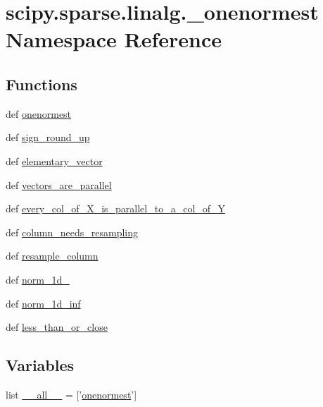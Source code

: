 \hypertarget{namespacescipy_1_1sparse_1_1linalg_1_1__onenormest}{}\section{scipy.\+sparse.\+linalg.\+\_\+onenormest Namespace Reference}
\label{namespacescipy_1_1sparse_1_1linalg_1_1__onenormest}
\subsection*{Functions}
\begin{DoxyCompactItemize}
\item 
def \hyperlink{namespacescipy_1_1sparse_1_1linalg_1_1__onenormest_a90813fe55db4e2c30f4ccd874c5bf117}{onenormest}
\item 
def \hyperlink{namespacescipy_1_1sparse_1_1linalg_1_1__onenormest_adf75977d22fe85b425c08a754dd4d4f6}{sign\+\_\+round\+\_\+up}
\item 
def \hyperlink{namespacescipy_1_1sparse_1_1linalg_1_1__onenormest_a688dda78fdf831b1482fb78e951f082b}{elementary\+\_\+vector}
\item 
def \hyperlink{namespacescipy_1_1sparse_1_1linalg_1_1__onenormest_a67ee4c8d1a1f9cd0d58974172f5617f2}{vectors\+\_\+are\+\_\+parallel}
\item 
def \hyperlink{namespacescipy_1_1sparse_1_1linalg_1_1__onenormest_ad817047ca7e3bca66af3e1bb02d69caa}{every\+\_\+col\+\_\+of\+\_\+\+X\+\_\+is\+\_\+parallel\+\_\+to\+\_\+a\+\_\+col\+\_\+of\+\_\+\+Y}
\item 
def \hyperlink{namespacescipy_1_1sparse_1_1linalg_1_1__onenormest_a4c50f0af1115d2a66893b7bd344be8fd}{column\+\_\+needs\+\_\+resampling}
\item 
def \hyperlink{namespacescipy_1_1sparse_1_1linalg_1_1__onenormest_aaebfd0e96d3707eb7da7c6e8d3ff66a2}{resample\+\_\+column}
\item 
def \hyperlink{namespacescipy_1_1sparse_1_1linalg_1_1__onenormest_a9c35f1cad1d73ac657a3c15aaaf1b9ba}{norm\+\_\+1d\+\_}
\item 
def \hyperlink{namespacescipy_1_1sparse_1_1linalg_1_1__onenormest_abc9d30c5d3b4bc2928f620929f4ec170}{norm\+\_\+1d\+\_\+inf}
\item 
def \hyperlink{namespacescipy_1_1sparse_1_1linalg_1_1__onenormest_aa2259a6fff3457357faf0928deb950d9}{less\+\_\+than\+\_\+or\+\_\+close}
\end{DoxyCompactItemize}
\subsection*{Variables}
\begin{DoxyCompactItemize}
\item 
list \hyperlink{namespacescipy_1_1sparse_1_1linalg_1_1__onenormest_ac2c933e61f367215794e75c7956b3c32}{\+\_\+\+\_\+all\+\_\+\+\_\+} = \mbox{[}'\hyperlink{namespacescipy_1_1sparse_1_1linalg_1_1__onenormest_a90813fe55db4e2c30f4ccd874c5bf117}{onenormest}'\mbox{]}
\end{DoxyCompactItemize}



